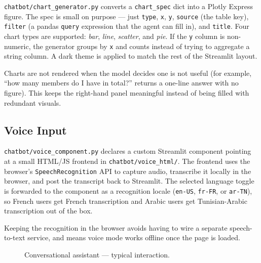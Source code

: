 \texttt{chatbot/chart\_generator.py} converts a \texttt{chart\_spec} dict
into a Plotly Express figure. The spec is small on purpose --- just
\texttt{type}, \texttt{x}, \texttt{y}, \texttt{source} (the table key),
\texttt{filter} (a pandas \texttt{query} expression that the agent can
fill in), and \texttt{title}. Four chart types are supported:
\textit{bar}, \textit{line}, \textit{scatter}, and \textit{pie}. If the
\texttt{y} column is non-numeric, the generator groups by \texttt{x} and
counts instead of trying to aggregate a string column. A dark theme is
applied to match the rest of the Streamlit layout.

Charts are not rendered when the model decides one is not useful (for
example, ``how many members do I have in total?'' returns a one-line
answer with no figure). This keeps the right-hand panel meaningful
instead of being filled with redundant visuals.

\subsection{Voice Input}

\texttt{chatbot/voice\_component.py} declares a custom Streamlit
component pointing at a small HTML/JS frontend in
\texttt{chatbot/voice\_html/}. The frontend uses the browser's
\texttt{SpeechRecognition} API to capture audio, transcribe it locally
in the browser, and post the transcript back to Streamlit. The selected
language toggle is forwarded to the component as a recognition locale
(\texttt{en-US}, \texttt{fr-FR}, or \texttt{ar-TN}), so French users
get French transcription and Arabic users get Tunisian-Arabic
transcription out of the box.

Keeping the recognition in the browser avoids having to wire a separate
speech-to-text service, and means voice mode works offline once the page
is loaded.

\begin{figure}[H]
  \centering
  \caption{Conversational assistant --- typical interaction.}
  \label{fig:chatbot_main}
\end{figure}

